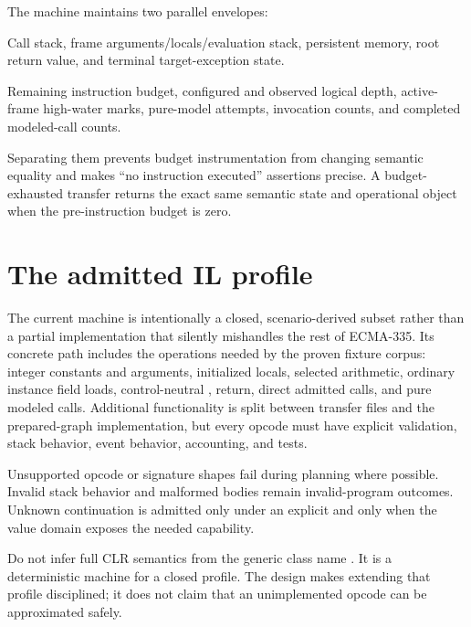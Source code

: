 \documentclass[11pt,oneside,openany]{book}
\newcommand{\typeName}[1]{\texttt{\detokenize{#1}}}
\newcommand{\codeinline}[1]{\texttt{\detokenize{#1}}}
\begin{document}
The machine maintains two parallel envelopes:

\begin{description}[style=nextline]
  \item[Semantic state] Call stack, frame arguments/locals/evaluation stack, persistent memory, root return value, and terminal target-exception state.
  \item[Operational state] Remaining instruction budget, configured and observed logical depth, active-frame high-water marks, pure-model attempts, invocation counts, and completed modeled-call counts.
\end{description}

Separating them prevents budget instrumentation from changing semantic equality and makes ``no instruction executed'' assertions precise. A budget-exhausted transfer returns the exact same semantic state and operational object when the pre-instruction budget is zero.

\section{The admitted IL profile}

The current machine is intentionally a closed, scenario-derived subset rather than a partial implementation that silently mishandles the rest of ECMA-335. Its concrete path includes the operations needed by the proven fixture corpus: integer constants and arguments, initialized locals, selected arithmetic, ordinary instance field loads, control-neutral \codeinline{nop}, return, direct admitted calls, and pure modeled calls. Additional functionality is split between transfer files and the prepared-graph implementation, but every opcode must have explicit validation, stack behavior, event behavior, accounting, and tests.

Unsupported opcode or signature shapes fail during planning where possible. Invalid stack behavior and malformed bodies remain invalid-program outcomes. Unknown continuation is admitted only under an explicit \typeName{UnknownExecutionPolicy} and only when the value domain exposes the needed capability.

\begin{warningbox}
Do not infer full CLR semantics from the generic class name \typeName{IlMachine}. It is a deterministic machine for a closed profile. The design makes extending that profile disciplined; it does not claim that an unimplemented opcode can be approximated safely.
\end{warningbox}
\end{document}
